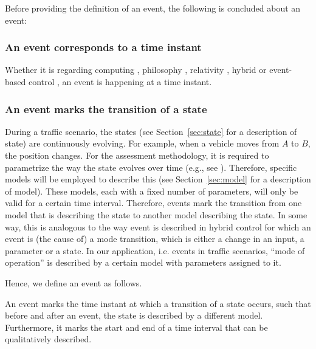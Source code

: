 Before providing the definition of an event, the following is concluded about an event:

\subsubsection{An event corresponds to a time instant}
Whether it is regarding computing \cite{breu1997towards}, philosophy \cite{kim1993supervenience}, relativity \cite{sartori1996understanding}, hybrid or event-based control \cite{branicky1998hybridcontrol, deschutter2003hybrid, heemels2012eventcontrol}, an event is happening at a time instant.

\subsubsection{An event marks the transition of a state}
During a traffic scenario, the states (see Section~\ref{sec:state} for a description of state) are continuously evolving. For example, when a vehicle moves from $A$ to $B$, the position changes. For the assessment methodology, it is required to parametrize the way the state evolves over time (e.g., see \cite{deGelder2017assessment}). Therefore, specific models will be employed to describe this (see Section~\ref{sec:model} for a description of model). These models, each with a fixed number of parameters, will only be valid for a certain time interval. Therefore, events mark the transition from one model that is describing the state to another model describing the state. In some way, this is analogous to the way event is described in hybrid control \cite{boel1999hybridcontrol} for which an event is (the cause of) a mode transition, which is either a change in an input, a parameter or a state. In our application, i.e. events in traffic scenarios, ``mode of operation'' is described by a certain model with parameters assigned to it.

Hence, we define an event as follows.
\begin{definition}[Event]
	An event marks the time instant at which a transition of a state occurs, such that before and after an event, the state is described by a different model. Furthermore, it marks the start and end of a time interval that can be qualitatively described.
\end{definition}


